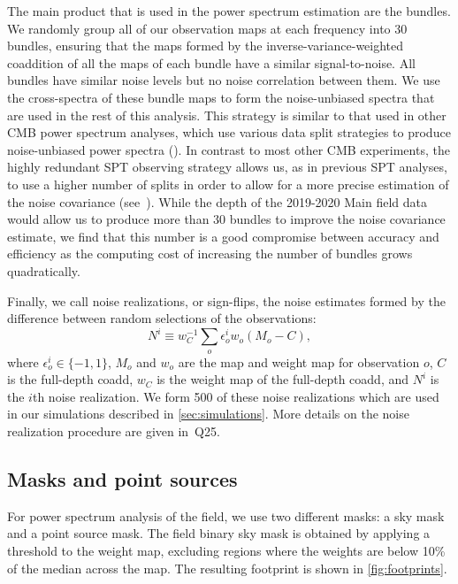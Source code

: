 The main product that is used in the power spectrum estimation are the {bundles}. 
We randomly group all of our observation maps at each frequency into 30 bundles, ensuring that the maps formed by the inverse-variance-weighted coaddition of all the maps of each bundle have a similar signal-to-noise. 
All bundles have similar noise levels but no noise correlation between them. 
We use the cross-spectra of these bundle maps to form the noise-unbiased spectra that are used in the rest of this analysis. 
This strategy is similar to that used in other CMB power spectrum analyses, which use various data split strategies to produce noise-unbiased power spectra (\cite{planck18-5,dutcher21,louis25}). 
In contrast to most other CMB experiments, the highly redundant SPT observing strategy allows us, as in previous SPT analyses, to use a higher number of splits in order to allow for a more precise estimation of the noise covariance (see~\citep{lueker10,dutcher21}).
While the depth of the 2019-2020 Main field data would allow us to produce more than 30 bundles to improve the  noise covariance estimate, we find that this number is a good compromise between accuracy and efficiency as the computing cost of increasing the number of bundles grows quadratically.

Finally, we call {noise realizations}, or {sign-flips}, the noise estimates formed by the difference between random selections of the observations:
\begin{equation}
	N^i \equiv w_C^{-1} \sum_o \epsilon^i_o w_o (M_o - C),
\end{equation}
where $\epsilon^i_o \in \{-1, 1\}$, $M_o$ and $w_o$ are the map and weight map for observation $o$, $C$ is the {full-depth coadd}, $w_C$ is the weight map of the {full-depth coadd}, and $N^i$ is the $i$th noise realization. 
We form 500 of these noise realizations which are used in our simulations described in \cref{sec:simulations}. 
More details on the noise realization procedure are given in~Q25.

\subsection{Masks and point sources}
\label{sec:mask}

For power spectrum analysis of the \mainfield{} field, we use two different masks: a {sky mask} and a {point source mask}.
The \mainfield{} field binary sky mask is obtained by applying a threshold to the weight map, excluding regions where the weights are below 10\% of the median across the map.
The resulting footprint is shown in \cref{fig:footprints}. 

